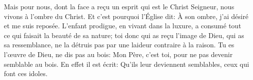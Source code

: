 Mais pour nous, dont la face a reçu un esprit qui est le Christ Seigneur,
	nous vivons à l’ombre du Christ.
Et c’est pourquoi l’Église dit:
	À son ombre, j’ai désiré et me suis reposée.
L’enfant prodigue, en vivant dans la luxure,
	a consumé tout ce qui faisait la beauté de sa nature;
	toi donc qui as reçu l’image de Dieu, qui as sa ressemblance,
	ne la détruis pas par une laideur contraire à la raison.
Tu es l’œuvre de Dieu, ne dis pas au bois: Mon Père, c’est toi,
	pour ne pas devenir semblable au bois.
En effet il est écrit:
	Qu’ils leur deviennent semblables, ceux qui font ces idoles.
